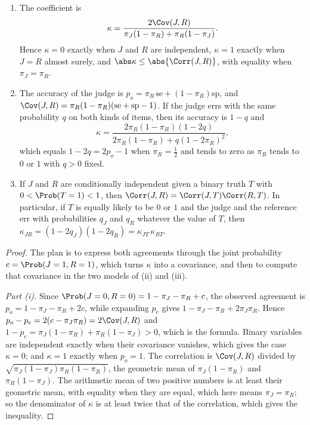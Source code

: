 \begin{refsection}
\begin{proposition}\label{prop:instruments:kappa}
\begin{enumerate}
\item The coefficient is
\[
\kappa=\frac{2\Cov(J,R)}{\pi_J(1-\pi_R)+\pi_R(1-\pi_J)}.
\]
Hence $\kappa=0$ exactly when $J$ and $R$ are independent, $\kappa=1$ exactly when $J=R$ almost surely, and $\abs\kappa\le\abs{\Corr(J,R)}$, with equality when $\pi_J=\pi_R$.
\item The accuracy of the judge is $p_o=\pi_R\,\mathrm{se}+(1-\pi_R)\mathrm{sp}$, and $\Cov(J,R)=\pi_R(1-\pi_R)(\mathrm{se}+\mathrm{sp}-1)$. If the judge errs with the same probability $q$ on both kinds of items, then its accuracy is $1-q$ and
\[
\kappa=\frac{2\pi_R(1-\pi_R)(1-2q)}{2\pi_R(1-\pi_R)+q(1-2\pi_R)^2},
\]
which equals $1-2q=2p_o-1$ when $\pi_R=\frac12$ and tends to zero as $\pi_R$ tends to $0$ or $1$ with $q>0$ fixed.
\item If $J$ and $R$ are conditionally independent given a binary truth $T$ with $0<\Prob(T=1)<1$, then $\Corr(J,R)=\Corr(J,T)\Corr(R,T)$. In particular, if $T$ is equally likely to be $0$ or $1$ and the judge and the reference err with probabilities $q_J$ and $q_R$ whatever the value of $T$, then $\kappa_{JR}=(1-2q_J)(1-2q_R)=\kappa_{JT}\,\kappa_{RT}$.
\end{enumerate}
\end{proposition}

\begin{proof}
The plan is to express both agreements through the joint probability $c=\Prob(J=1,R=1)$, which turns $\kappa$ into a covariance, and then to compute that covariance in the two models of (ii) and (iii).

\emph{Part (i).} Since $\Prob(J=0,R=0)=1-\pi_J-\pi_R+c$, the observed agreement is $p_o=1-\pi_J-\pi_R+2c$, while expanding $p_e$ gives $1-\pi_J-\pi_R+2\pi_J\pi_R$. Hence $p_o-p_e=2(c-\pi_J\pi_R)=2\Cov(J,R)$ and $1-p_e=\pi_J(1-\pi_R)+\pi_R(1-\pi_J)>0$, which is the formula. Binary variables are independent exactly when their covariance vanishes, which gives the case $\kappa=0$; and $\kappa=1$ exactly when $p_o=1$. The correlation is $\Cov(J,R)$ divided by $\sqrt{\pi_J(1-\pi_J)\pi_R(1-\pi_R)}$, the geometric mean of $\pi_J(1-\pi_R)$ and $\pi_R(1-\pi_J)$. The arithmetic mean of two positive numbers is at least their geometric mean, with equality when they are equal, which here means $\pi_J=\pi_R$; so the denominator of $\kappa$ is at least twice that of the correlation, which gives the inequality.


\end{proof}
\end{refsection}
